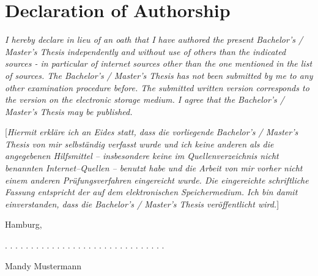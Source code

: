 \documentclass[a4paper,12pt]{article}
\newcommand{\thesistype}{Bachelor's / Master's Thesis}
\newcommand{\thesisauthor}{Mandy Mustermann}
\newcommand{\thesisdate}{}
\begin{document}
\newpage

\hypertarget{declaration-of-authorship}{%
\section{Declaration of Authorship}\label{declaration-of-authorship}}

\emph{I hereby declare in lieu of an oath that I have authored the present \thesistype{} independently and
without use of others than the indicated sources - in particular of internet sources other than
the one mentioned in the list of sources. The \thesistype{} has not been submitted by me
to any other examination procedure before. The submitted written version corresponds to the
version on the electronic storage medium. I agree that the \thesistype{} may be published.}
\vspace{0.5cm}

{[}\emph{Hiermit erkläre ich an Eides statt, dass die vorliegende \thesistype{} von mir selbständig
verfasst wurde und ich keine anderen als die angegebenen Hilfsmittel -- insbesondere
keine im Quellenverzeichnis nicht benannten Internet--Quellen -- benutzt habe und die
Arbeit von mir vorher nicht einem anderen Prüfungsverfahren eingereicht wurde. Die
eingereichte schriftliche Fassung entspricht der auf dem elektronischen Speichermedium.
Ich bin damit einverstanden, dass die \thesistype{} veröffentlicht wird.}{]}
\vspace{1cm}

Hamburg, \thesisdate{}
\vspace{3cm}

. . . . . . . . . . . . . . . . . . . . . . . . . . . . . . .
\vspace{0.1cm}

\thesisauthor{}

\end{document}
